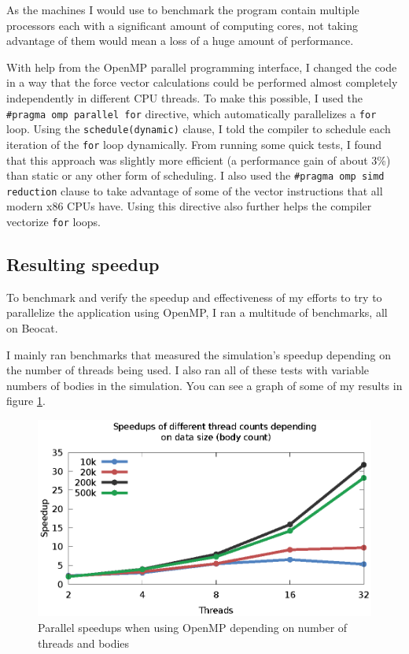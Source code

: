 \documentclass[journal]{IEEEtran}
\begin{document}
		As the machines I would use to benchmark the program contain multiple processors each with a significant amount of computing cores, not taking advantage of them would mean a loss of a huge amount of performance.
		
		With help from the OpenMP parallel programming interface, I changed the code in a way that the force vector calculations could be performed almost completely independently in different CPU threads. To make this possible, I used the \texttt{\#pragma omp parallel for} directive, which automatically parallelizes a \texttt{for} loop. Using the \texttt{schedule(dynamic)} clause, I told the compiler to schedule each iteration of the \texttt{for} loop dynamically. From running some quick tests, I found that this approach was slightly more efficient (a performance gain of about 3\%) than static or any other form of scheduling. I also used the \texttt{\#pragma omp simd reduction} clause to take advantage of some of the vector instructions that all modern x86 CPUs have. Using this directive also further helps the compiler vectorize \texttt{for} loops.
		
		\subsection*{Resulting speedup}
			To benchmark and verify the speedup and effectiveness of my efforts to try to parallelize the application using OpenMP, I ran a multitude of benchmarks, all on Beocat.
			
			I mainly ran benchmarks that measured the simulation's speedup depending on the number of threads being used. I also ran all of these tests with variable numbers of bodies in the simulation. You can see a graph of some of my results in figure \ref{parspeedup}. 
			
			\begin{figure}[ht]			
				\centering
				\includegraphics[width=.5\textwidth]{gnuplot/speedup.eps}
				\caption{\label{parspeedup}Parallel speedups when using OpenMP depending on number of threads and bodies}
			\end{figure} 
			
\end{document}
